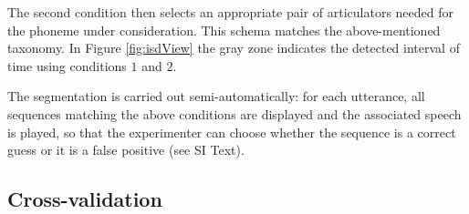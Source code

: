 The second condition then selects an appropriate pair of articulators needed for the
phoneme under consideration. This schema matches the above-mentioned taxonomy. In Figure
\ref{fig:isdView} the gray zone indicates the detected interval of time using conditions
$1$ and $2$.
 
The segmentation is carried out semi-automatically: for each
utterance, all sequences matching the above conditions are displayed and the
associated speech is played, so that the experimenter can choose whether the
sequence is a correct guess or it is a false positive (see SI Text).



\subsection{Cross-validation}
\label{subsec:cv}

